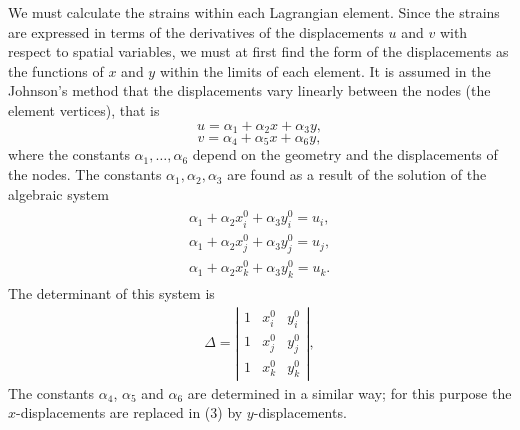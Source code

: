    We must calculate the strains within each Lagrangian element. Since the
strains are expressed in terms of the derivatives of the displacements $u$ and
$v$ with respect to spatial variables, we must at first find the form of
the displacements as the functions of $x$ and $y$ within the limits of
each element. It is assumed in the Johnson's method that the displacements
vary linearly between the nodes (the element vertices), that is
\begin{equation}
u = \alpha_1 + \alpha_2 x + \alpha_3 y,
\end{equation}
\begin{equation}
v = \alpha_4 + \alpha_5 x + \alpha_6 y,
\end{equation}
where the constants $\alpha_1,\ldots,\alpha_{6}$ depend  on the geometry and
the displacements of the nodes. The constants $\alpha_1,\alpha_2,\alpha_3$
are found as a result of the solution of the algebraic system
\begin{eqnarray}
\begin{array}{l}
\alpha_1 + \alpha_2 x_i^0 + \alpha_3 y_i^0 = u_i,\\
\alpha_1 + \alpha_2 x_j^0 + \alpha_3 y_j^0 = u_j,\\
\alpha_1 + \alpha_2 x_k^0 + \alpha_3 y_k^0 = u_k.
\end{array}
\end{eqnarray}
The determinant of this system is
\begin{eqnarray}
\Delta= \left | \begin {array}{lll}
1 & x_i^0 & y_i^0\\
1 & x_j^0 & y_j^0\\
1 & x_k^0 & y_k^0
\end{array} \right |,
\end{eqnarray}
The constants $\alpha_4$, $\alpha_5$ and $\alpha_6$ are determined in a
similar way; for this purpose the $x$-displacements are replaced in (3) by
$y$-displacements.

